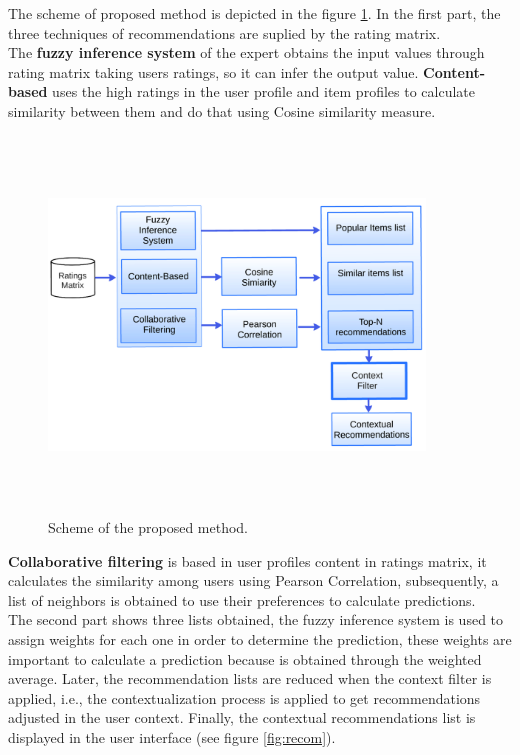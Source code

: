 The scheme of proposed method is depicted in the figure
\ref{fig:archit}. In the first part, the three techniques of
recommendations are suplied by the rating matrix. \\ The \textbf{fuzzy
inference system} of the expert  obtains the input values  through
rating matrix taking users ratings, so it can infer the output value.
\textbf{Content-based} uses the high ratings in the user profile and item
profiles to calculate similarity between them and do that using Cosine
similarity measure.
\begin{figure}
\captionsetup{font=footnotesize}
\centering 
\includegraphics[width=10cm,height=10cm,keepaspectratio]{img/archit.png}
\caption{Scheme of the proposed method.}
\label{fig:archit}  
\end{figure}
\textbf{Collaborative filtering} is based in user profiles content in
ratings matrix, it calculates the similarity among  users using
Pearson Correlation, subsequently,  a list of neighbors is obtained to
use their preferences to calculate predictions.\\
The second part shows three lists obtained, the fuzzy inference system
is used to assign weights for each one in order to determine the
prediction, these weights are important to calculate a
prediction because is obtained through the weighted average.
Later, the recommendation lists are reduced when the context filter is
applied, i.e., the contextualization process is applied to get
recommendations adjusted in the user context. 
Finally, the contextual recommendations list is displayed in the 
user interface (see figure \ref{fig:recom}).

